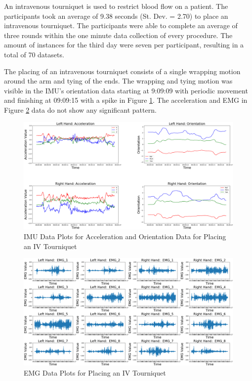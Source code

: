An intravenous tourniquet is used to restrict blood flow on a patient. The participants took an average of 9.38 seconds (St. Dev. = 2.70) to place an intravenous tourniquet. The participants were able to complete an average of three rounds within the one minute data collection of every procedure. The amount of instances for the third day were seven per participant, resulting in a total of 70 datasets.
\par The placing of an intravenous tourniquet consists of a single wrapping motion around the arm and tying of the ends. The wrapping and tying motion was visible in the IMU's orientation data starting at 9:09:09 with periodic movement and finishing at 09:09:15 with a spike in Figure \ref{fig:4501imuday3t7}. The acceleration and EMG in Figure \ref{fig:4501emgday3t7} data do not show any significant pattern.
\begin{figure}[!h]
	\centering
	\includegraphics[width=0.8\linewidth]{pictures/4501_IMU_Day3_t_7}
	\caption{IMU Data Plots for Acceleration and Orientation Data for Placing an IV Tourniquet}
	\label{fig:4501imuday3t7}
\end{figure}
\begin{figure}[!h]
	\centering
	\includegraphics[width=0.8\linewidth]{pictures/4501_EMG_Day3_t_7}
	\caption{EMG Data Plots for Placing an IV Tourniquet}
	\label{fig:4501emgday3t7}
\end{figure}

